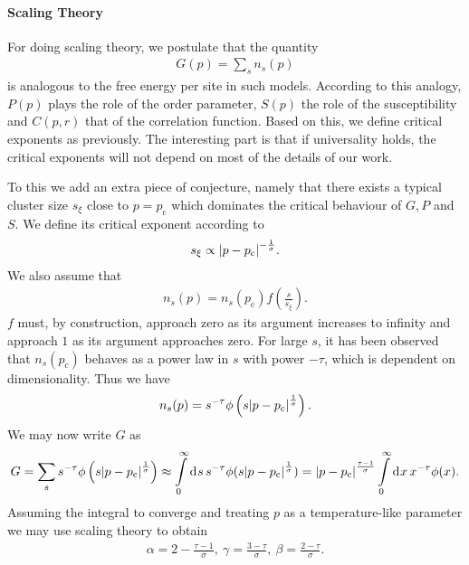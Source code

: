 \paragraph{Scaling Theory}
For doing scaling theory, we postulate that the quantity
\begin{align*}
	G(p) = \sum\limits_{s}n_{s}(p)
\end{align*}
is analogous to the free energy per site in such models. According to this analogy, $P(p)$ plays the role of the order parameter, $S(p)$ the role of the susceptibility and $C(p, r)$ that of the correlation function. Based on this, we define critical exponents as previously. The interesting part is that if universality holds, the critical exponents will not depend on most of the details of our work.

To this we add an extra piece of conjecture, namely that there exists a typical cluster size $s_{\xi}$ close to $p = p_{\text{c}}$ which dominates the critical behaviour of $G, P$ and $S$. We define its critical exponent according to
\begin{align*}
	s_{\xi} \propto \abs{p - p_{\text{c}}}^{-\frac{1}{\sigma}}.
\end{align*}
We also assume that
\begin{align*}
	n_{s}(p) = n_{s}(p_{\text{c}})f\left(\frac{s}{s_{\xi}}\right).
\end{align*}
$f$ must, by construction, approach zero as its argument increases to infinity and approach $1$ as its argument approaches zero. For large $s$, it has been observed that $n_{s}(p_{\text{c}})$ behaves as a power law in $s$ with power $-\tau$, which is dependent on dimensionality. Thus we have
\begin{align*}
	n_{s}(p) = s^{-\tau}\phi\left(s\abs{p - p_{\text{c}}}^{\frac{1}{\sigma}}\right).
\end{align*}
We may now write $G$ as
\begin{align*}
	G = \sum\limits_{s}s^{-\tau}\phi\left(s\abs{p - p_{\text{c}}}^{\frac{1}{\sigma}}\right) \approx \int\limits_{0}^{\infty}\dd[]{s}s^{-\tau}\phi(s\abs{p - p_{\text{c}}}^{\frac{1}{\sigma}}) = \abs{p - p_{\text{c}}}^{\frac{\tau - 1}{\sigma}}\int\limits_{0}^{\infty}\dd[]{x}x^{-\tau}\phi(x).
\end{align*}
Assuming the integral to converge and treating $p$ as a temperature-like parameter we may use scaling theory to obtain
\begin{align*}
	\alpha = 2 - \frac{\tau - 1}{\sigma},\ \gamma = \frac{3 - \tau}{\sigma},\ \beta = \frac{2 - \tau}{\sigma}.
\end{align*}


